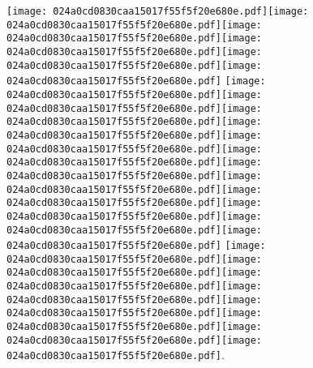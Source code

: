 \documentclass{article}
\newcommand{\origpg}[2]{\texttt{[image: 024a0cd0830caa15017f55f5f20e680e.pdf]}}
\begin{document}
{\vspace{0.646pt}\hspace{36.161pt}\origpg4{121.46pt 458.07pt 129.68pt 474.21pt}\origpg4{129.68pt 458.07pt 136.85pt 474.21pt}\origpg4{136.85pt 458.07pt 145.48pt 474.21pt}\origpg4{145.55pt 458.07pt 154.18pt 474.21pt}\origpg4{154.18pt 458.07pt 58mm 474.21pt}\origpg4{58mm 458.07pt 175.24pt 474.21pt} \origpg4{179.02pt 458.07pt 187.66pt 474.21pt}\origpg4{187.66pt 458.07pt 194.82pt 474.21pt}\hspace{-0.145pt}\origpg4{194.68pt 458.07pt 203.31pt 474.21pt}\hspace{-0.21pt}\origpg4{203.1pt 458.07pt 211.17pt 474.21pt}\hspace{-0.113pt}\origpg4{211.06pt 458.07pt 218.22pt 474.21pt}\origpg4{218.27pt 458.07pt 225.89pt 474.21pt}\hspace{-0.145pt}\origpg4{225.75pt 458.07pt 233.8pt 474.21pt}\origpg4{233.7pt 458.07pt 240.87pt 474.21pt}\hspace{-0.178pt}\origpg4{240.69pt 458.07pt 249.33pt 474.21pt}\origpg4{249.33pt 458.07pt 257.96pt 474.21pt}\origpg4{258.03pt 458.07pt 265.19pt 474.21pt}\hspace{-0.178pt}\origpg4{265.02pt 458.07pt 275.23pt 474.21pt} \origpg4{279.22pt 458.07pt 286.39pt 474.21pt}\hspace{-0.178pt}\origpg4{286.21pt 458.07pt 294.05pt 474.21pt}\hspace{-0.613pt}\origpg4{293.44pt 458.07pt 301.51pt 474.21pt}\hspace{-0.113pt}\origpg4{301.4pt 458.07pt 309.47pt 474.21pt}\origpg4{309.56pt 458.07pt 317.63pt 474.21pt}\origpg4{317.73pt 458.07pt 324.9pt 474.21pt}\origpg4{324.94pt 458.07pt 332pt 474.21pt}\origpg4{331.93pt 458.07pt 340.57pt 474.21pt}. 

\vspace{19.754pt}\hspace{36.161pt} 

}
\end{document}

